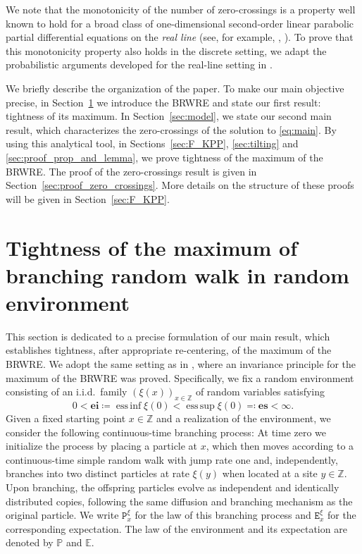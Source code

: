 \documentclass[12pt,reqno,oneside]{amsart}
\numberwithin{equation}{section}
\theoremstyle{definition}
\theoremstyle{remark}
\newcommand{\Z}{\mathbb{Z}}
\newcommand{\PP}{\mathbb{P}}
\newcommand{\E}{\mathbb{E}}
\newcommand{\es}{\mathbf{es}}
\newcommand{\ei}{\mathbf{ei}}
\DeclareMathOperator{\essinf}{ess\,inf}
\DeclareMathOperator{\esssup}{ess\,sup}
\begin{document}
We note that the monotonicity of the number of zero-crossings is a property
well known to hold for a broad class of one-dimensional second-order linear
parabolic partial differential equations on the \emph{real line} (see, for
  example, \cite{Ang88}, \cite{Nad15}). To prove that this monotonicity
property also holds in the discrete setting, we adapt the probabilistic
arguments developed for the real-line setting in \cite{EW99}.

We briefly describe the organization of the paper. To make our main objective
precise, in Section~\ref{sec:tightness_result} we introduce the BRWRE and
state our first result: tightness of its maximum. In Section~\ref{sec:model},
we state our second main result, which characterizes the zero-crossings of
the solution to \eqref{eq:main}. By using this analytical tool, in
Sections~\ref{sec:F_KPP}, \ref{sec:tilting} and
\ref{sec:proof_prop_and_lemma}, we prove tightness of the maximum of the
BRWRE. The proof of the zero-crossings result is given in
Section~\ref{sec:proof_zero_crossings}. More details on the structure of
these proofs will be given in Section~\ref{sec:F_KPP}.


\section{Tightness of the maximum of branching random walk in random environment}
\label{sec:tightness_result}

This section is dedicated to a precise formulation of our main result, which
establishes tightness, after appropriate re-centering, of the maximum of the
BRWRE. We adopt the same setting as in \cite{CD20}, where an invariance
principle for the maximum of the BRWRE was proved. Specifically, we fix a
random environment consisting of an i.i.d.~family $(\xi(x))_{x \in \Z}$ of
random variables satisfying
\begin{equation}
  \label{eq:ellipticity}
  0< \ei \coloneq \essinf \xi(0)
  < \esssup \xi(0) \eqcolon \es< \infty.
\end{equation}
Given a fixed starting point $x \in \Z$ and a realization of the environment,
we consider the following continuous-time branching process: At time zero we
initialize the process by placing a particle at $x$, which then moves
according to a continuous-time simple random walk with jump rate one and,
independently, branches into two distinct particles at rate $\xi(y)$ when
located at a site $y \in \Z$. Upon branching, the offspring particles evolve
as independent and identically distributed copies, following the same
diffusion and branching mechanism as the original particle. We write
$\mathtt{P}_x^\xi$ for the law of this branching process and
$\mathtt{E}_x^\xi$ for the corresponding expectation. The law of the
environment and its expectation are denoted by $\PP$ and $\E$.
\end{document}
